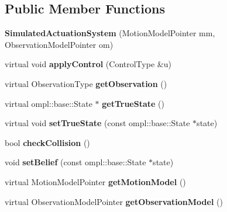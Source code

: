 \subsection*{\-Public \-Member \-Functions}
\begin{DoxyCompactItemize}
\item 
\hypertarget{class_simulated_actuation_system_ae6d51c97eff49314b1b4da41ddbf0a77}{{\bfseries \-Simulated\-Actuation\-System} (\-Motion\-Model\-Pointer mm, \-Observation\-Model\-Pointer om)}\label{class_simulated_actuation_system_ae6d51c97eff49314b1b4da41ddbf0a77}

\item 
\hypertarget{class_simulated_actuation_system_a6e5a988011048fcd7df2a68c558f6340}{virtual void {\bfseries apply\-Control} (\-Control\-Type \&u)}\label{class_simulated_actuation_system_a6e5a988011048fcd7df2a68c558f6340}

\item 
\hypertarget{class_simulated_actuation_system_a7a69fe802ad7b1ecbe45e2f221071bee}{virtual \-Observation\-Type {\bfseries get\-Observation} ()}\label{class_simulated_actuation_system_a7a69fe802ad7b1ecbe45e2f221071bee}

\item 
\hypertarget{class_simulated_actuation_system_a7d77f257e56cffbe7133faab50048734}{virtual ompl\-::base\-::\-State $\ast$ {\bfseries get\-True\-State} ()}\label{class_simulated_actuation_system_a7d77f257e56cffbe7133faab50048734}

\item 
\hypertarget{class_simulated_actuation_system_ac6f6e2c9dd429b2d50228b181663ee54}{virtual void {\bfseries set\-True\-State} (const ompl\-::base\-::\-State $\ast$state)}\label{class_simulated_actuation_system_ac6f6e2c9dd429b2d50228b181663ee54}

\item 
\hypertarget{class_simulated_actuation_system_a5d3bdb4d82ffcc98b4bc529ef30f9cfb}{bool {\bfseries check\-Collision} ()}\label{class_simulated_actuation_system_a5d3bdb4d82ffcc98b4bc529ef30f9cfb}

\item 
\hypertarget{class_simulated_actuation_system_a7359da743b5a171e03cff9512c0d6545}{void {\bfseries set\-Belief} (const ompl\-::base\-::\-State $\ast$state)}\label{class_simulated_actuation_system_a7359da743b5a171e03cff9512c0d6545}

\item 
\hypertarget{class_simulated_actuation_system_abe43894eee6e30f630d8f325b30acf12}{virtual \-Motion\-Model\-Pointer {\bfseries get\-Motion\-Model} ()}\label{class_simulated_actuation_system_abe43894eee6e30f630d8f325b30acf12}

\item 
\hypertarget{class_simulated_actuation_system_ad29b96470450e5f2aff883fdffd95e59}{virtual \-Observation\-Model\-Pointer {\bfseries get\-Observation\-Model} ()}\label{class_simulated_actuation_system_ad29b96470450e5f2aff883fdffd95e59}

\end{DoxyCompactItemize}
